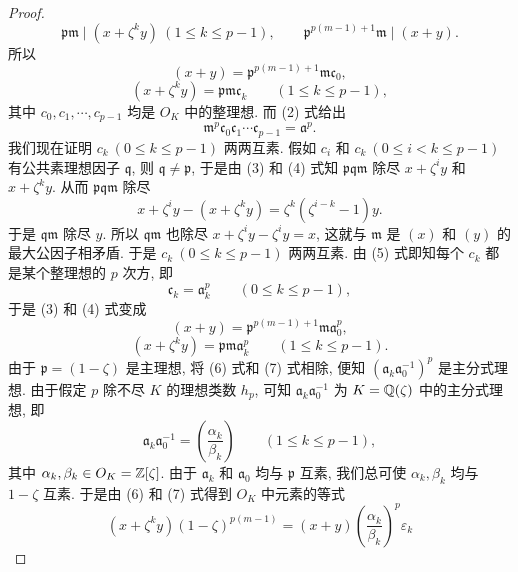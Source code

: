 \begin{proof}
\[
  \mathfrak{pm}\mid(x+\zeta^ky)\ (1\leqslant k\leqslant p-1),\qquad
  \mathfrak{p}^{p(m-1)+1}\mathfrak{m}\mid(x+y).
\]
所以
\begin{equation}\tag{3}
  (x+y)=\mathfrak{p}^{p(m-1)+1}\mathfrak{mc}_0,
\end{equation}
\begin{equation}\tag{4}
  (x+\zeta^ky)=\mathfrak{pmc}_k\qquad(1\leqslant k\leqslant p-1),
\end{equation}
其中 $c_0,c_1,\cdots,c_{p-1}$ 均是 $O_K$ 中的整理想. 而 (2) 式给出
\begin{equation}\tag{5}
  \mathfrak{m}^p\mathfrak{c}_0\mathfrak{c}_1\cdots\mathfrak{c}_{p-1}=\mathfrak{a}^p.
\end{equation}
我们现在证明 $c_k\ (0\leqslant k\leqslant p-1)$ 两两互素. 假如 $c_i$ 和 $c_k\ (0\leqslant i<k\leqslant p-1)$ 有公共素理想因子 $\mathfrak{q}$, 则 $\mathfrak{q}\neq\mathfrak{p}$, 于是由 (3) 和 (4) 式知 $\mathfrak{pqm}$ 除尽 $x+\zeta^iy$ 和 $x+\zeta^ky$. 从而 $\mathfrak{pqm}$ 除尽
\[
  x+\zeta^iy-(x+\zeta^ky)=\zeta^k(\zeta^{i-k}-1)y.
\]
于是 $\mathfrak{qm}$ 除尽 $y$. 所以 $\mathfrak{qm}$ 也除尽 $x+\zeta^iy-\zeta^iy=x$, 这就与 $\mathfrak{m}$ 是 $(x)$ 和 $(y)$ 的最大公因子相矛盾. 于是 $c_k\ (0\leqslant k\leqslant p-1)$ 两两互素. 由 (5) 式即知每个 $c_k$ 都是某个整理想的 $p$ 次方, 即
\[
  \mathfrak{c}_k=\mathfrak{a}_k^p\qquad(0\leqslant k\leqslant p-1),
\]
于是 (3) 和 (4) 式变成
\begin{equation}\tag{6}
  (x+y)=\mathfrak{p}^{p(m-1)+1}\mathfrak{ma}_0^p,
\end{equation}
\begin{equation}\tag{7}
  (x+\zeta^ky)=\mathfrak{pma}_k^p\qquad(1\leqslant k\leqslant p-1).
\end{equation}
由于 $\mathfrak{p}=(1-\zeta)$ 是主理想, 将 (6) 式和 (7) 式相除, 便知 $(\mathfrak{a}_k\mathfrak{a}_0^{-1})^p$ 是主分式理想. 由于假定 $p$ 除不尽 $K$ 的理想类数 $h_p$, 可知 $\mathfrak{a}_k\mathfrak{a}_0^{-1}$ 为 $K=\mathbb{Q}(\zeta)$ 中的主分式理想, 即
\begin{equation}\tag{8}
  \mathfrak{a}_k\mathfrak{a}_0^{-1}=\left(\frac{\alpha_k}{\beta_k}\right)\qquad(1\leqslant k\leqslant p-1),
\end{equation}
其中 $\alpha_k,\beta_k\in O_K=\mathbb{Z}[\zeta]$. 由于 $\mathfrak{a}_k$ 和 $\mathfrak{a}_0$ 均与 $\mathfrak{p}$ 互素, 我们总可使 $\alpha_k,\beta_k$ 均与 $1-\zeta$ 互素. 于是由 (6) 和 (7) 式得到 $O_K$ 中元素的等式
\begin{equation}\tag{9}
  (x+\zeta^ky)(1-\zeta)^{p(m-1)}=(x+y)\left(\frac{\alpha_k}{\beta_k}\right)^p\varepsilon_k

\end{equation}
\end{proof}
